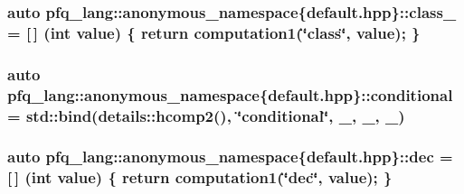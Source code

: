 \hypertarget{namespacepfq__lang_1_1anonymous__namespace_02default_8hpp_03_a27a683ef93570a66844e1a0106e6336a}{
\subsubsection[{class\-\_\-}]{\setlength{\rightskip}{0pt plus 5cm}auto pfq\-\_\-lang\-::anonymous\-\_\-namespace\{default.\-hpp\}\-::class\-\_\- = \mbox{[}$\,$\mbox{]} (int value) \{ return {\bf computation1}(\char`\"{}class\char`\"{}, value); \}}}\label{namespacepfq__lang_1_1anonymous__namespace_02default_8hpp_03_a27a683ef93570a66844e1a0106e6336a}
\hypertarget{namespacepfq__lang_1_1anonymous__namespace_02default_8hpp_03_a022d0075edf2fff575b93377aec0c228}{
\subsubsection[{conditional}]{\setlength{\rightskip}{0pt plus 5cm}auto pfq\-\_\-lang\-::anonymous\-\_\-namespace\{default.\-hpp\}\-::conditional = std\-::bind(details\-::hcomp2(), \char`\"{}conditional\char`\"{}, \-\_, \-\_, \-\_)}}\label{namespacepfq__lang_1_1anonymous__namespace_02default_8hpp_03_a022d0075edf2fff575b93377aec0c228}
\hypertarget{namespacepfq__lang_1_1anonymous__namespace_02default_8hpp_03_a6e71e558e459e950a4e9beeaaaf12cf6}{
\subsubsection[{dec}]{\setlength{\rightskip}{0pt plus 5cm}auto pfq\-\_\-lang\-::anonymous\-\_\-namespace\{default.\-hpp\}\-::dec = \mbox{[}$\,$\mbox{]} (int value) \{ return {\bf computation1}(\char`\"{}dec\char`\"{}, value); \}}}\label{namespacepfq__lang_1_1anonymous__namespace_02default_8hpp_03_a6e71e558e459e950a4e9beeaaaf12cf6}
